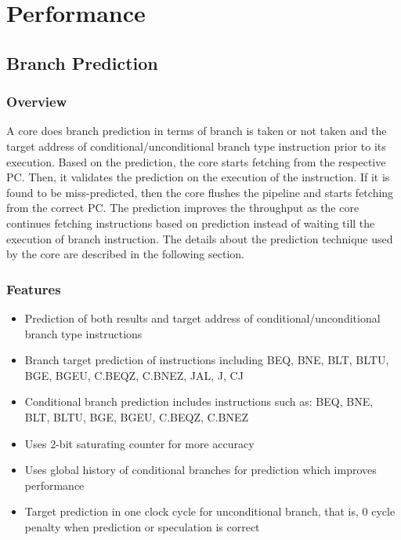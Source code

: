 \documentclass[main\_\_EN.tex]{subfiles}
\begin{document}
\newpage
\section{Performance}
\label{sec:riscvcpu-perf-enhancements}


\subsection{Branch Prediction}
\label{sec:riscvcpu-perf-bp}

\subsubsection{Overview}
\label{sec:riscvcpu-perf-bp-overview}
A core does branch prediction in terms of branch is taken or not taken and the target address of conditional/unconditional branch type instruction prior to its execution. Based on the prediction, the core starts fetching from the respective PC. Then, it validates the prediction on the execution of the instruction. If it is found to be miss-predicted, then the core flushes the pipeline and starts fetching from the correct PC. The prediction improves the throughput as the core continues fetching instructions based on prediction instead of waiting till the execution of branch instruction. The details about the prediction technique used by the core are described in the following section.

\subsubsection{Features}
\label{sec:riscvcpu-perf-bp-features}
\begin{itemize}
    \item Prediction of both results and target address of conditional/unconditional branch type instructions
    \item Branch target prediction of instructions including BEQ, BNE, BLT, BLTU, BGE, BGEU, C.BEQZ, C.BNEZ, JAL, J, CJ
    \item Conditional branch prediction includes instructions such as: BEQ, BNE, BLT, BLTU, BGE, BGEU, C.BEQZ, C.BNEZ
    \item Uses 2-bit saturating counter for more accuracy
    \item Uses global history of conditional branches for prediction which improves performance
    \item Target prediction in one clock cycle for unconditional branch, that is, 0 cycle penalty when prediction or speculation is correct
\end{itemize}
\end{document}
